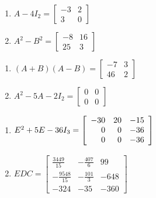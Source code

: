 \documentclass{ximera}
\begin{document}
\begin{multicols}{2} 
\begin{enumerate}
\setcounter{enumi}{\value{HW}}

\item  $A - 4I_{2} = \left[ \begin{array}{rr} -3 & 2 \\ 3 & 0 \end{array} \right]$

\item  $A^2 - B^2 = \left[ \begin{array}{rr} -8 & 16 \\ 25 & 3 \end{array} \right]$


\setcounter{HW}{\value{enumi}}
\end{enumerate}
\end{multicols}

\begin{multicols}{2} 
\begin{enumerate}
\setcounter{enumi}{\value{HW}}

\item  $(A+B)(A-B) = \left[ \begin{array}{rr} -7 & 3 \\ 46 & 2 \end{array} \right]$

\item  $A^2-5A-2I_{2} = \left[ \begin{array}{rr} 0 & 0 \\ 0 & 0 \end{array} \right]$


\setcounter{HW}{\value{enumi}}
\end{enumerate}
\end{multicols}

\begin{multicols}{2} 
\begin{enumerate}
\setcounter{enumi}{\value{HW}}

\item  $E^2 + 5E-36I_{3} = \left[ \begin{array}{rrr} -30 & 20 & -15 \\ 0 & 0 & -36 \\ 0 & 0 & -36 \end{array} \right] \vphantom{\left[ \begin{array}{rrr} \frac{3449}{15} & -\frac{407}{6} & 99 \\[3pt] -\frac{9548}{15} & -\frac{101}{3} & -648 \\ -324 & -35 & -360 \end{array} \right]}$

\item $EDC = \left[ \begin{array}{rrr} \frac{3449}{15} & -\frac{407}{6} & 99 \\[3pt] -\frac{9548}{15} & -\frac{101}{3} & -648 \\ -324 & -35 & -360 \end{array} \right]$


\setcounter{HW}{\value{enumi}}
\end{enumerate}
\end{multicols}
\end{document}
